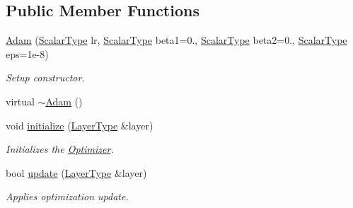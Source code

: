 \subsection*{Public Member Functions}
\begin{DoxyCompactItemize}
\item 
\hyperlink{classffnn_1_1optimizer_1_1_adam_3_01layer_1_1_fully_connected_3_01_value_type_00_01_inputs_at_co08ce471fd3ee7441a350cc42cfd35bcd_af3e2278852cdc5e2e3382992e36ccce3}{Adam} (\hyperlink{classffnn_1_1optimizer_1_1_adam_3_01layer_1_1_fully_connected_3_01_value_type_00_01_inputs_at_co08ce471fd3ee7441a350cc42cfd35bcd_a3cd3f5a825a36308f81ff39f9dd51dd1}{Scalar\-Type} lr, \hyperlink{classffnn_1_1optimizer_1_1_adam_3_01layer_1_1_fully_connected_3_01_value_type_00_01_inputs_at_co08ce471fd3ee7441a350cc42cfd35bcd_a3cd3f5a825a36308f81ff39f9dd51dd1}{Scalar\-Type} beta1=0., \hyperlink{classffnn_1_1optimizer_1_1_adam_3_01layer_1_1_fully_connected_3_01_value_type_00_01_inputs_at_co08ce471fd3ee7441a350cc42cfd35bcd_a3cd3f5a825a36308f81ff39f9dd51dd1}{Scalar\-Type} beta2=0., \hyperlink{classffnn_1_1optimizer_1_1_adam_3_01layer_1_1_fully_connected_3_01_value_type_00_01_inputs_at_co08ce471fd3ee7441a350cc42cfd35bcd_a3cd3f5a825a36308f81ff39f9dd51dd1}{Scalar\-Type} eps=1e-\/8)
\begin{DoxyCompactList}\small\item\em Setup constructor. \end{DoxyCompactList}\item 
virtual \hyperlink{classffnn_1_1optimizer_1_1_adam_3_01layer_1_1_fully_connected_3_01_value_type_00_01_inputs_at_co08ce471fd3ee7441a350cc42cfd35bcd_aa5cab60a5d10331e2e02ea932c58b2d0}{$\sim$\-Adam} ()
\item 
void \hyperlink{classffnn_1_1optimizer_1_1_adam_3_01layer_1_1_fully_connected_3_01_value_type_00_01_inputs_at_co08ce471fd3ee7441a350cc42cfd35bcd_aa67f949f7a1228c221d06b1b1e03c28b}{initialize} (\hyperlink{classffnn_1_1optimizer_1_1_adam_3_01layer_1_1_fully_connected_3_01_value_type_00_01_inputs_at_co08ce471fd3ee7441a350cc42cfd35bcd_ad82ece03afb695075874eaed356433d2}{Layer\-Type} \&layer)
\begin{DoxyCompactList}\small\item\em Initializes the \hyperlink{classffnn_1_1optimizer_1_1_optimizer}{Optimizer}. \end{DoxyCompactList}\item 
bool \hyperlink{classffnn_1_1optimizer_1_1_adam_3_01layer_1_1_fully_connected_3_01_value_type_00_01_inputs_at_co08ce471fd3ee7441a350cc42cfd35bcd_ad42586e39195fc9a72057f20b657f8be}{update} (\hyperlink{classffnn_1_1optimizer_1_1_adam_3_01layer_1_1_fully_connected_3_01_value_type_00_01_inputs_at_co08ce471fd3ee7441a350cc42cfd35bcd_ad82ece03afb695075874eaed356433d2}{Layer\-Type} \&layer)
\begin{DoxyCompactList}\small\item\em Applies optimization update. \end{DoxyCompactList}\end{DoxyCompactItemize}
